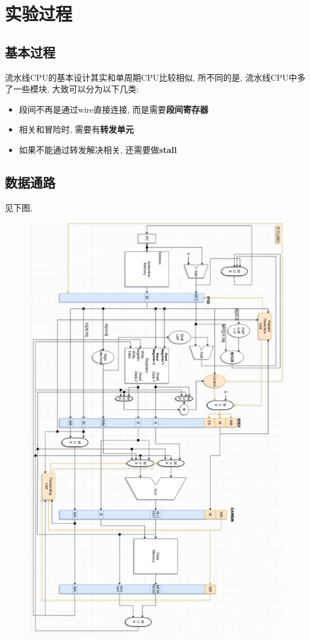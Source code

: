 \documentclass[UTF8]{article}
\begin{document}
\section{实验过程}
\subsection{基本过程}
流水线CPU的基本设计其实和单周期CPU比较相似, 所不同的是, 流水线CPU中多了一些模块, 大致可以分为以下几类:
\begin{itemize}
	\item 段间不再是通过wire直接连接, 而是需要\textbf{段间寄存器}
	\item 相关和冒险时, 需要有\textbf{转发单元}
	\item 如果不能通过转发解决相关, 还需要做\textbf{stall}
\end{itemize}
\subsection{数据通路}
见下图,
\begin{figure}[H]
	\centering
	\includegraphics[width=\linewidth*6/7]{data_path.png}
	\label{data_path}
\end{figure}
\end{document}
